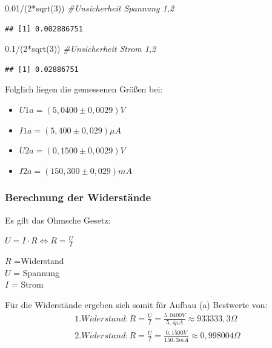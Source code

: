 \documentclass[
  9pt,
]{article}
\newenvironment{Shaded}{\begin{snugshade}}{\end{snugshade}}
\newcommand{\CommentTok}[1]{\textcolor[rgb]{0.56,0.35,0.01}{\textit{#1}}}
\newcommand{\DecValTok}[1]{\textcolor[rgb]{0.00,0.00,0.81}{#1}}
\newcommand{\FloatTok}[1]{\textcolor[rgb]{0.00,0.00,0.81}{#1}}
\newcommand{\FunctionTok}[1]{\textcolor[rgb]{0.00,0.00,0.00}{#1}}
\newcommand{\NormalTok}[1]{#1}
\newcommand{\SpecialCharTok}[1]{\textcolor[rgb]{0.00,0.00,0.00}{#1}}
\begin{document}
\begin{Shaded}
\begin{Highlighting}[]
\FloatTok{0.01}\SpecialCharTok{/}\NormalTok{(}\DecValTok{2}\SpecialCharTok{*}\FunctionTok{sqrt}\NormalTok{(}\DecValTok{3}\NormalTok{)) }\CommentTok{\#Unsicherheit Spannung 1,2}
\end{Highlighting}
\end{Shaded}

\begin{verbatim}
## [1] 0.002886751
\end{verbatim}

\begin{Shaded}
\begin{Highlighting}[]
\FloatTok{0.1}\SpecialCharTok{/}\NormalTok{(}\DecValTok{2}\SpecialCharTok{*}\FunctionTok{sqrt}\NormalTok{(}\DecValTok{3}\NormalTok{)) }\CommentTok{\#Unsicherheit Strom 1,2}
\end{Highlighting}
\end{Shaded}

\begin{verbatim}
## [1] 0.02886751
\end{verbatim}

Folglich liegen die gemessenen Größen bei:

\begin{itemize}
\item $U1a = (5,0400 \pm 0,0029)V$
\item $I1a = (5,400 \pm 0,029) \mu A$
\item $U2a = (0,1500 \pm 0,0029)V$
\item $I2a = (150,300 \pm 0,029) mA$
\end{itemize}

\hypertarget{berechnung-der-widerstuxe4nde}{%
\subsubsection{Berechnung der
Widerstände}\label{berechnung-der-widerstuxe4nde}}

Es gilt das Ohmsche Gesetz:

\(U=I\cdot R \Leftrightarrow R = \frac{U}{I}\)

\noindent \(R\) =Widerstand\\
\noindent \(U\) = Spannung\\
\noindent \(I\) = Strom

Für die Widerstände ergeben sich somit für Aufbau (a) Bestwerte von:
\begin{equation*}
\begin{split}
1. Widerstand: R=\frac{U}{I} = \frac {5,0400V}{5,4 \mu A} \approx 933333,3 \Omega \\
2.Widerstand: R=\frac{U}{I} = \frac {0,1500V}{150,3 mA} \approx 0,998004 \Omega \\
\end{split}
\end{equation*}
\end{document}

